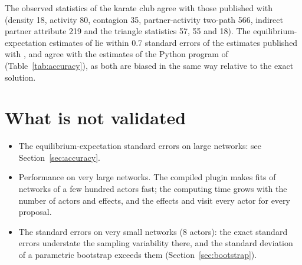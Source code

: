 The observed statistics of the karate club agree with those published with \alaamee{} (density 18, activity 80, contagion 35, partner-activity two-path 566, indirect partner attribute 219 and the triangle statistics 57, 55 and 18). The equilibrium-expectation estimates of \nwalaam{} lie within 0.7 standard errors of the \mpnet{} estimates published with \alaamee{}, and agree with the estimates of the Python program of \alaamee{} (Table~\ref{tab:accuracy}), as both are biased in the same way relative to the exact solution.

\section{What is not validated}

\begin{itemize}[nosep]
  \item The equilibrium-expectation standard errors on large networks: see Section~\ref{sec:accuracy}.
  \item Performance on very large networks. The compiled plugin makes fits of networks of a few hundred actors fast; the computing time grows with the number of actors and effects, and the effects  and  visit every actor for every proposal.
  \item The standard errors on very small networks (8 actors): the exact standard errors understate the sampling variability there, and the standard deviation of a parametric bootstrap exceeds them (Section~\ref{sec:bootstrap}).
\end{itemize}
